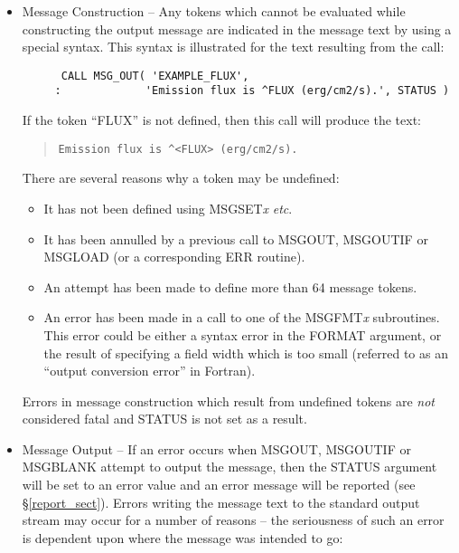 \documentclass[twoside,11pt]{article}
\newcommand{\htmlref}[2]{#1}
\newcommand{\latex}[1]{#1}
\renewcommand{\_}{\texttt{\symbol{95}}}
\begin{document}
\begin {itemize}
\item Message Construction -- Any tokens which cannot be evaluated while
constructing the output message are indicated in the message text by using a
special syntax. 
This syntax is illustrated for the text resulting from the call:

\begin {small}
\begin{verbatim}
      CALL MSG_OUT( 'EXAMPLE_FLUX', 
     :             'Emission flux is ^FLUX (erg/cm2/s).', STATUS )
\end{verbatim}
\end {small}

If the token ``FLUX'' is not defined, then this call will produce the text:

\begin {quote}
\begin {small}
\begin{verbatim}
Emission flux is ^<FLUX> (erg/cm2/s).
\end{verbatim}
\end {small}
\end {quote}

There are several reasons why a token may be undefined:

\begin {itemize}
\item It has not been defined using MSG\_SET\textit{x} \textit{etc}.

\item It has been annulled by a previous call to MSG\_OUT, MSG\_OUTIF 
or MSG\_LOAD (or a corresponding ERR routine).

\item An attempt has been made to define more than 64 message tokens.

\item An error has been made in a call to one of the MSG\_FMT\textit{x} 
subroutines. 
This error could be either a syntax error in the FORMAT argument, or the
result of specifying a field width which is too small (referred to 
as an ``output conversion error'' in Fortran). 
\end {itemize}

Errors in message construction which result from undefined tokens are \emph{not}
considered fatal and STATUS is not set as a result.

\item Message Output -- If an error occurs when
MSG\_OUT, MSG\_OUTIF or MSG\_BLANK attempt to output the message, then the 
STATUS argument will be set to an error value and an  error message will be 
\htmlref{reported}{report_sect}\latex{ (see \S\ref{report_sect})}.
Errors writing the message text to the standard output stream may occur for a
number of reasons -- the seriousness of such an error is dependent upon where 
the message was intended to go:


\end{itemize}
\end{document}
